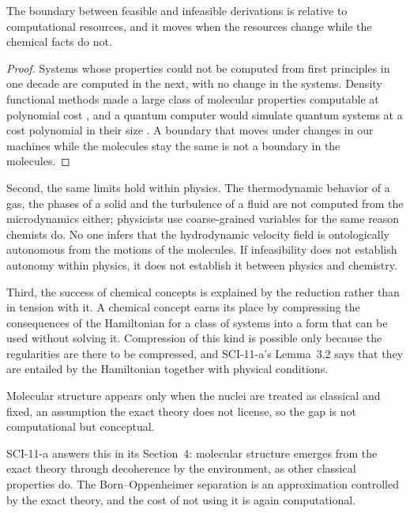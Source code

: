 \documentclass{situationist-preprint}
\begin{document}
\begin{proposition}\label{p:relative}
The boundary between feasible and infeasible derivations is relative to computational resources, and it moves when the resources change while the chemical facts do not.
\end{proposition}

\begin{proof}
Systems whose properties could not be computed from first principles in one decade are computed in the next, with no change in the systems. Density functional methods made a large class of molecular properties computable at polynomial cost \citep{Kohn1999}, and a quantum computer would simulate quantum systems at a cost polynomial in their size \citep{Feynman1982}. A boundary that moves under changes in our machines while the molecules stay the same is not a boundary in the molecules.
\end{proof}

Second, the same limits hold within physics. The thermodynamic behavior of a gas, the phases of a solid and the turbulence of a fluid are not computed from the microdynamics either; physicists use coarse-grained variables for the same reason chemists do. No one infers that the hydrodynamic velocity field is ontologically autonomous from the motions of the molecules. If infeasibility does not establish autonomy within physics, it does not establish it between physics and chemistry.

Third, the success of chemical concepts is explained by the reduction rather than in tension with it. A chemical concept earns its place by compressing the consequences of the Hamiltonian for a class of systems into a form that can be used without solving it. Compression of this kind is possible only because the regularities are there to be compressed, and SCI-11-a's Lemma~3.2 says that they are entailed by the Hamiltonian together with physical conditions.

\begin{objection}
Molecular structure appears only when the nuclei are treated as classical and fixed, an assumption the exact theory does not license, so the gap is not computational but conceptual.
\end{objection}

\begin{reply}
SCI-11-a answers this in its Section~4: molecular structure emerges from the exact theory through decoherence by the environment, as other classical properties do. The Born--Oppenheimer separation is an approximation controlled by the exact theory, and the cost of not using it is again computational.
\end{reply}
\end{document}
